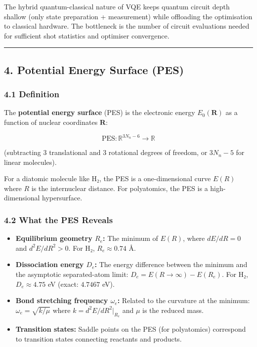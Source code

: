 \documentclass[
  11pt,
]{report}
\begin{document}
The hybrid quantum-classical nature of VQE keeps quantum circuit depth
shallow (only state preparation + measurement) while offloading the
optimisation to classical hardware. The bottleneck is the number of
circuit evaluations needed for sufficient shot statistics and optimiser
convergence.

\begin{center}\rule{0.5\linewidth}{0.5pt}\end{center}

\subsection{4. Potential Energy Surface
(PES)}\label{potential-energy-surface-pes}

\subsubsection{4.1 Definition}\label{definition}

The \textbf{potential energy surface} (PES) is the electronic energy
\(E_0(\mathbf{R})\) as a function of nuclear coordinates \(\mathbf{R}\):

\[\text{PES}: \mathbb{R}^{3N_n - 6} \to \mathbb{R}\]

(subtracting 3 translational and 3 rotational degrees of freedom, or
\(3N_n - 5\) for linear molecules).

For a diatomic molecule like H₂, the PES is a one-dimensional curve
\(E(R)\) where \(R\) is the internuclear distance. For polyatomics, the
PES is a high-dimensional hypersurface.

\subsubsection{4.2 What the PES Reveals}\label{what-the-pes-reveals}

\begin{itemize}
\item
  \textbf{Equilibrium geometry \(R_e\):} The minimum of \(E(R)\), where
  \(dE/dR = 0\) and \(d^2E/dR^2 > 0\). For H₂, \(R_e \approx 0.74\) Å.
\item
  \textbf{Dissociation energy \(D_e\):} The energy difference between
  the minimum and the asymptotic separated-atom limit:
  \(D_e = E(R \to \infty) - E(R_e)\). For H₂, \(D_e \approx 4.75\) eV
  (exact: \(4.7467\) eV).
\item
  \textbf{Bond stretching frequency \(\omega_e\):} Related to the
  curvature at the minimum: \(\omega_e = \sqrt{k/\mu}\) where
  \(k = d^2E/dR^2|_{R_e}\) and \(\mu\) is the reduced mass.
\item
  \textbf{Transition states:} Saddle points on the PES (for polyatomics)
  correspond to transition states connecting reactants and products.
\end{itemize}
\end{document}
